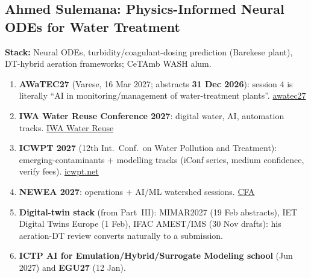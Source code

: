 \documentclass[11pt,a4paper]{article}
\begin{document}
\subsection{Ahmed Sulemana: Physics-Informed Neural ODEs for Water Treatment}
\textbf{Stack:} Neural ODEs, turbidity/coagulant-dosing prediction (Barekese plant), DT-hybrid aeration frameworks; CeTAmb WASH alum.
\begin{enumerate}[leftmargin=1.6em]
  \item \textbf{AWaTEC27} (Varese, 16 Mar 2027; abstracts \textbf{31 Dec 2026}): session 4 is literally ``AI in monitoring/management of water-treatment plants''. \href{https://awatec27.dista.uninsubria.it/}{awatec27}
  \item \textbf{IWA Water Reuse Conference 2027}: digital water, AI, automation tracks. \href{https://www.awa.asn.au/iwareuse2027/call-for-abstracts}{IWA Water Reuse}
  \item \textbf{ICWPT 2027} (12th Int.\ Conf.\ on Water Pollution and Treatment): emerging-contaminants + modelling tracks (iConf series, medium confidence, verify fees). \href{https://www.icwpt.net/cfp.html}{icwpt.net}
  \item \textbf{NEWEA 2027}: operations $+$ AI/ML watershed sessions. \href{https://www.newea.org/wp-content/uploads/2026/04/AC27_CFA-1.pdf}{CFA}
  \item \textbf{Digital-twin stack} (from Part~III): MIMAR2027 (19 Feb abstracts), IET Digital Twins Europe (1 Feb), IFAC AMEST/IMS (30 Nov drafts): his aeration-DT review converts naturally to a submission.
  \item \textbf{ICTP AI for Emulation/Hybrid/Surrogate Modeling school} (Jun 2027) and \textbf{EGU27} (12 Jan).
\end{enumerate}
\end{document}
